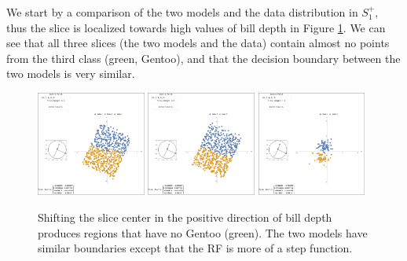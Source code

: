 \documentclass[]{interact}
\theoremstyle{plain}%
\theoremstyle{definition}
\theoremstyle{remark}
\begin{document}
We start by a comparison of the two models and the data distribution in
\(S_1^{+}\), thus the slice is localized towards high values of bill
depth in Figure \ref{slice1p}. We can see that all three slices (the two
models and the data) contain almost no points from the third class
(green, Gentoo), and that the decision boundary between the two models
is very similar.

\begin{figure}[ht]
\centerline{\includegraphics[width=0.32\textwidth]{figures/slice1_p_rf.png}
\includegraphics[width=0.32\textwidth]{figures/slice1_p_lda.png}
\includegraphics[width=0.32\textwidth]{figures/slice1_p_data.png}}
\caption{Shifting the slice center in the positive direction of bill depth produces regions that have no Gentoo (green). The two models have similar boundaries except that the RF is more of a step function.}
\label{slice1p}
\end{figure}
\end{document}
